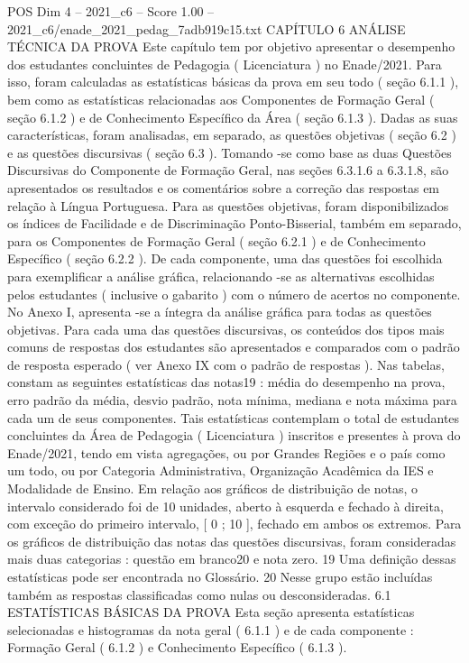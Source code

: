 \begin{textsample}{POS Dim 4 – 2021\_c6 – Score 1.00 – 2021\_c6/enade\_2021\_pedag\_7adb919c15.txt}  \label{ex:f4_pos_070}
CAPÍTULO 6 ANÁLISE TÉCNICA DA PROVA Este capítulo tem por objetivo apresentar o desempenho dos estudantes concluintes de Pedagogia ( Licenciatura ) no Enade/2021.
Para isso, foram calculadas as estatísticas básicas da prova em seu todo ( seção 6.1.1 ), bem como as estatísticas relacionadas aos Componentes de Formação Geral ( seção 6.1.2 ) e de Conhecimento Específico da Área ( seção 6.1.3 ).
Dadas as suas características, foram analisadas, em separado, as questões objetivas ( seção 6.2 ) e as questões discursivas ( seção 6.3 ).
Tomando -se como base as duas Questões Discursivas do Componente de Formação Geral, nas seções 6.3.1.6 a 6.3.1.8, são apresentados os resultados e os comentários sobre a correção das respostas em relação à Língua Portuguesa.
Para as questões objetivas, foram disponibilizados os índices de Facilidade e de Discriminação Ponto-Bisserial, também em separado, para os Componentes de Formação Geral ( seção 6.2.1 ) e de Conhecimento Específico ( seção 6.2.2 ).
De cada componente, uma das questões foi escolhida para exemplificar a análise gráfica, relacionando -se as alternativas escolhidas pelos estudantes ( inclusive o gabarito ) com o número de acertos no componente.
No Anexo I, apresenta -se a íntegra da análise gráfica para todas as questões objetivas.
Para cada uma das questões discursivas, os conteúdos dos tipos mais comuns de respostas dos estudantes são apresentados e comparados com o padrão de resposta esperado ( ver Anexo IX com o padrão de respostas ).
Nas tabelas, constam as seguintes estatísticas das notas19 : média do desempenho na prova, erro padrão da média, desvio padrão, nota mínima, mediana e nota máxima para cada um de seus componentes.
Tais estatísticas contemplam o total de estudantes concluintes da Área de Pedagogia ( Licenciatura ) inscritos e presentes à prova do Enade/2021, tendo em vista agregações, ou por Grandes Regiões e o país como um todo, ou por Categoria Administrativa, Organização Acadêmica da IES e Modalidade de Ensino.
Em relação aos gráficos de distribuição de notas, o intervalo considerado foi de 10 unidades, aberto à esquerda e fechado à direita, com exceção do primeiro intervalo, [ 0 ; 10 ], fechado em ambos os extremos.
Para os gráficos de distribuição das notas das questões discursivas, foram consideradas mais duas categorias : questão em branco20 e nota zero. 19 Uma definição dessas estatísticas pode ser encontrada no Glossário. 20 Nesse grupo estão incluídas também as respostas classificadas como nulas ou desconsideradas. 6.1 ESTATÍSTICAS BÁSICAS DA PROVA Esta seção apresenta estatísticas selecionadas e histogramas da nota geral ( 6.1.1 ) e de cada componente : Formação Geral ( 6.1.2 ) e Conhecimento Específico ( 6.1.3 ).

\end{textsample}
